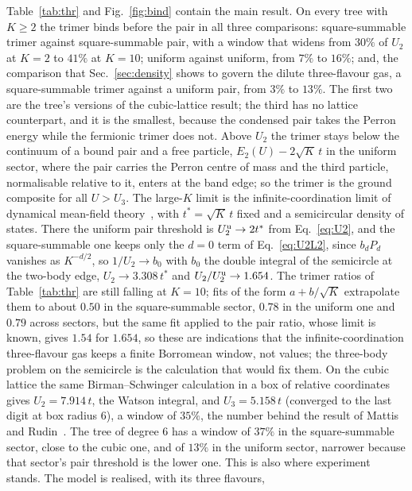 \documentclass[aps,pre,twocolumn,superscriptaddress,floatfix]{revtex4-2}
\newcommand{\Ut}{U_{3}}
\newcommand{\Up}{U_{2}}
\begin{document}
Table~\ref{tab:thr} and Fig.~\ref{fig:bind} contain the main result. On
every tree with $K\ge2$ the trimer binds before the pair in all three
comparisons: square-summable trimer against square-summable pair, with a
window that widens from $30\%$ of $\Up$ at $K=2$ to $41\%$ at $K=10$;
uniform against uniform, from $7\%$ to $16\%$; and, the comparison that
Sec.~\ref{sec:density} shows to govern the dilute three-flavour gas, a
square-summable trimer against a uniform pair, from $3\%$ to $13\%$. The
first two are the tree's versions of the cubic-lattice result; the third
has no lattice counterpart, and it is the smallest, because the
condensed pair takes the Perron energy while the fermionic trimer does
not. Above $\Up$ the trimer stays below the continuum of a bound pair and
a free particle, $E_{2}(U)-2\sqrt{K}\,t$ in the uniform sector, where the
pair carries the Perron centre of mass and the third particle,
normalisable relative to it, enters at the band edge; so the trimer is
the ground composite for all $U>\Ut$. The large-$K$ limit is the
infinite-coordination limit of dynamical mean-field
theory~\cite{keller2001,garg2005}, with $t^{*}=\sqrt{K}\,t$ fixed and a
semicircular density of states. There the uniform pair threshold is
$\Up^{\rm u}\to2t^{*}$ from Eq.~\eqref{eq:U2}, and the square-summable one
keeps only the $d=0$ term of Eq.~\eqref{eq:U2L2}, since $b_{d}P_{d}$
vanishes as $K^{-d/2}$, so $1/\Up\to b_{0}$ with $b_{0}$ the double
integral of the semicircle at the two-body edge, $\Up\to3.308\,t^{*}$ and
$\Up/\Up^{\rm u}\to1.654$. The trimer ratios of Table~\ref{tab:thr} are
still falling at $K=10$; fits of the form $a+b/\sqrt{K}$ extrapolate them
to about $0.50$ in the square-summable sector, $0.78$ in the uniform one
and $0.79$ across sectors, but the same fit applied to the pair ratio,
whose limit is known, gives $1.54$ for $1.654$, so these are indications
that the infinite-coordination three-flavour gas keeps a finite Borromean
window, not values; the three-body problem on the semicircle is the
calculation that would fix them. On the cubic lattice the same Birman--Schwinger calculation in a
box of relative coordinates gives $\Up=7.914\,t$, the Watson integral, and $\Ut=5.158\,t$
(converged to the last digit at box radius $6$), a window of $35\%$, the
number behind the result of Mattis and Rudin~\cite{mattis1984}. The tree
of degree $6$ has a window of $37\%$ in the square-summable sector, close
to the cubic one, and of $13\%$ in the uniform sector, narrower
because that sector's pair threshold is the lower one. This is also
where experiment stands. The model is realised, with its three flavours,
\end{document}
